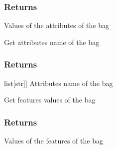 \documentclass[letterpaper,10pt,english]{sphinxmanual}
\begin{document}
\begin{fulllineitems}
\begin{fulllineitems}
\subsubsection{Returns}
\label{\detokenize{data/_autosummary/miml.data.bag.Bag:id5}}\begin{description}
\sphinxAtStartPar
Values of the attributes of the bag

\end{description}

\end{fulllineitems}


\begin{fulllineitems}
\label{\detokenize{data/_autosummary/miml.data.bag.Bag:miml.data.bag.Bag.get_attributes_name}}
\pysigstartsignatures
{}
\pysigstopsignatures
\sphinxAtStartPar
Get attributes name of the bag


\subsubsection{Returns}
\label{\detokenize{data/_autosummary/miml.data.bag.Bag:id6}}\begin{description}
\sphinxlineitem{attributes}{[}list{[}str{]}{]}
\sphinxAtStartPar
Attributes name of the bag

\end{description}

\end{fulllineitems}


\begin{fulllineitems}
\label{\detokenize{data/_autosummary/miml.data.bag.Bag:miml.data.bag.Bag.get_features}}
\pysigstartsignatures
{}
\pysigstopsignatures
\sphinxAtStartPar
Get features values of the bag


\subsubsection{Returns}
\label{\detokenize{data/_autosummary/miml.data.bag.Bag:id7}}\begin{description}
\sphinxAtStartPar
Values of the features of the bag


\end{description}
\end{fulllineitems}
\end{fulllineitems}
\end{document}
